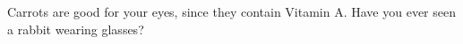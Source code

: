 \documentclass{article}
\begin{document}
Carrots are good for your eyes, since they contain Vitamin A\@. Have you ever seen a rabbit wearing glasses?
\end{document}
